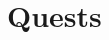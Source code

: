 \documentclass[a4paper]{article}
\begin{document}
\begin{comment}
\newpage
\subsection{Combat N: Blank Combat} \label{combat_n}

\begin{minipage}[t]{0.5\linewidth}
\begin{tabular}[t]{| p{7cm} |}
\toprule
\multicolumn{1}{|c|}{Combat Description} \\
\midrule
Simultaneous Problems :- \\
\\	
\midrule
Component Complexity :- \\
\\
\midrule
Problem Complexity :- \\
\\
\midrule
Enemy Description :- \\
\\
\midrule
Reason for Engagement :- \\
\\
\bottomrule
\end{tabular}
\end{minipage}
\begin{minipage}[t]{0.45\linewidth}
\begin{tabular}[t]{| r | p{5cm} |}
\toprule
\multicolumn{2}{| c |}{Battlefield Description} \\
\midrule
location &  \\
distances & \\
comm.s time & \\
\begin{tabular}[c]{@{}r@{}}relative\\velocities\end{tabular} & \\ 
visibility & \\ 
ions & \\
radioactivity & \\
UV radiation &  \\
molecules &  \\
scrap &  \\
asteroids &  \\
\bottomrule
\end{tabular}
\end{minipage}
\end{comment}



\newpage
\section{Quests} 
\end{document}
